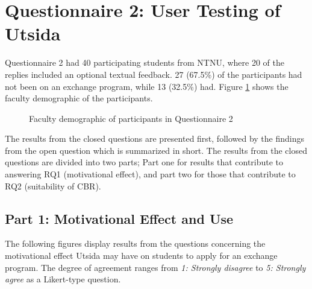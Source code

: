\section{Questionnaire 2: User Testing of Utsida}

Questionnaire 2 had 40 participating students from NTNU, where 20 of the replies included an optional textual feedback. 27 (67.5\%) of the participants had not been on an exchange program, while 13 (32.5\%) had. Figure \ref{fig:faculty_demographic} shows the faculty demographic of the participants.

\begin{figure}[h]
    \small
    \centering
    \caption{Faculty demographic of participants in Questionnaire 2}
    \label{fig:faculty_demographic}
\end{figure}

The results from the closed questions are presented first, followed by the findings from the open question which is summarized in short. The results from the closed questions are divided into two parts; Part one for results that contribute to answering RQ1 (motivational effect), and part two for those that contribute to RQ2 (suitability of CBR).

\subsection{Part 1: Motivational Effect and Use}

The following figures display results from the questions concerning the motivational effect Utsida may have on students to apply for an exchange program. The degree of agreement ranges from \textit{1: Strongly disagree} to \textit{5: Strongly agree} as a Likert-type question.


